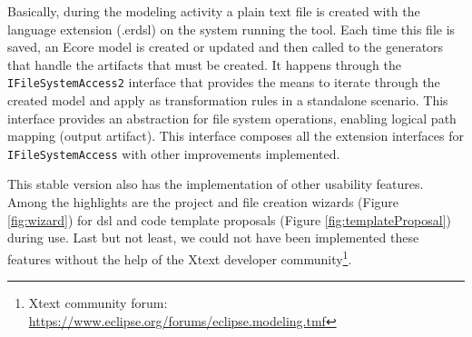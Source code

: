Basically, during the modeling activity a plain text file is created with the language extension (.erdsl) on the system running the tool.
Each time this file is saved, an Ecore model is created or updated and then called to the generators that handle the artifacts that must be created.
It happens through the \texttt {IFileSystemAccess2} interface that provides the means to iterate through the created model and apply as transformation rules in a standalone scenario.
This interface provides an abstraction for file system operations, enabling logical path mapping (output artifact).
This interface composes all the extension interfaces for \texttt {IFileSystemAccess} with other improvements implemented.

%     

This stable version also has the implementation of other usability features.
Among the highlights are the project and file creation wizards (Figure \ref{fig:wizard}) for \ac{dsl} and code template proposals (Figure \ref{fig:templateProposal}) during use.
Last but not least, we could not have been implemented these features without the help of the Xtext developer community\footnote{Xtext community forum: \url{https://www.eclipse.org/forums/eclipse.modeling.tmf}}.

